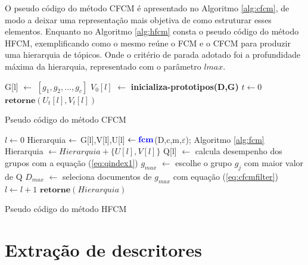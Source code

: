 O pseudo código do método CFCM é apresentado no Algoritmo \ref{alg:cfcm}, de modo a deixar uma
representação mais objetiva de como estruturar esses elementos. Enquanto no 
Algoritmo \ref{alg:hfcm} consta o
pseudo código do método HFCM, exemplificando como o mesmo reúne o FCM e o CFCM para produzir uma
hierarquia de tópicos. Onde o critério de parada adotado foi a profundidade máxima da hierarquia,
representado com o parâmetro $lmax$.

\begin{algorithm}[H] 
  \SetAlgoLined {} 
  G[l] $\gets$ $[g_1,g_2,...,g_c]$\; 
  $V_0[l]$ $\gets$ \textbf{{\color{blue}inicializa-prototipos}(D,G)}\; 
  $t \gets 0$\; 
  $\textbf{retorne} (U_t[l],V_t[l])$\; 
  \caption{Pseudo código do método CFCM}
  \label{alg:cfcm} 
\end{algorithm}

\begin{algorithm}[H] 
  \SetAlgoLined {} 
  $l \gets 0$\; 
  Hierarquia $\gets \empty$
  G[l],V[l],U[l] $\gets \textbf{{\color{blue}fcm}}$(D,c,m,$\varepsilon$); Algoritmo \ref{alg:fcm}\; 
  Hierarquia $\gets Hierarquia + \{U[l],V[l]\}$
  Q[l] $\gets$ calcula desempenho dos grupos com a equação (\ref{eq:qindex1})\;
  $g_{max}$ $\gets$ escolhe o grupo $g_j$ com maior valor de Q\;
  $D_{max}$ $\gets$ seleciona documentos de $g_{max}$ com equação (\ref{eq:cfcmfilter})\;
  $l \gets l + 1$\; 
  $\textbf{retorne} (Hierarquia)$\; 
  \caption{Pseudo código do método HFCM}
  \label{alg:hfcm} 
\end{algorithm}

\section{Extração de descritores} 

